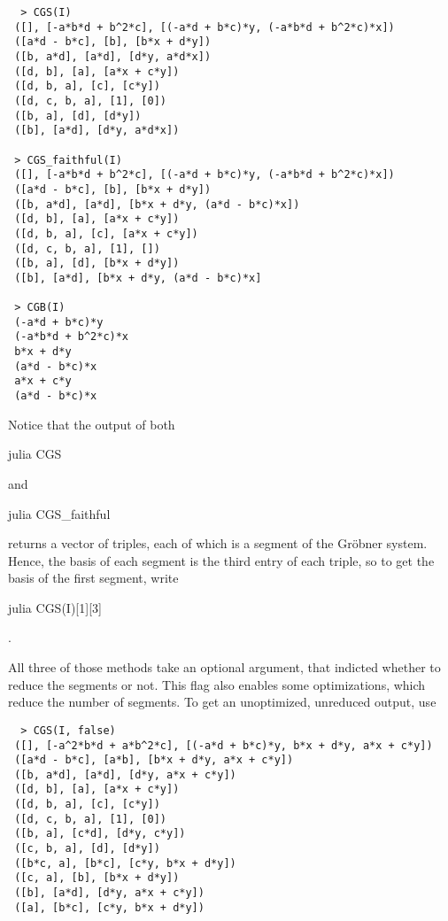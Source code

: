 \begin{verbatim}
  > CGS(I)
 ([], [-a*b*d + b^2*c], [(-a*d + b*c)*y, (-a*b*d + b^2*c)*x])
 ([a*d - b*c], [b], [b*x + d*y])
 ([b, a*d], [a*d], [d*y, a*d*x])
 ([d, b], [a], [a*x + c*y])
 ([d, b, a], [c], [c*y])
 ([d, c, b, a], [1], [0])
 ([b, a], [d], [d*y])
 ([b], [a*d], [d*y, a*d*x])

 > CGS_faithful(I)
 ([], [-a*b*d + b^2*c], [(-a*d + b*c)*y, (-a*b*d + b^2*c)*x])
 ([a*d - b*c], [b], [b*x + d*y])
 ([b, a*d], [a*d], [b*x + d*y, (a*d - b*c)*x])
 ([d, b], [a], [a*x + c*y])
 ([d, b, a], [c], [a*x + c*y])
 ([d, c, b, a], [1], [])
 ([b, a], [d], [b*x + d*y])
 ([b], [a*d], [b*x + d*y, (a*d - b*c)*x]

 > CGB(I)
 (-a*d + b*c)*y
 (-a*b*d + b^2*c)*x
 b*x + d*y
 (a*d - b*c)*x
 a*x + c*y
 (a*d - b*c)*x
\end{verbatim}
Notice that the output of both \begin{mintinline}{julia} CGS \end{mintinline} and \begin{mintinline}{julia} CGS_faithful \end{mintinline} returns a vector of triples, each of which is a segment of the Gröbner system. Hence, the basis of each segment is the third entry of each triple, so to get the basis of the first segment, write \begin{mintinline}{julia} CGS(I)[1][3] \end{mintinline}.

All three of those methods take an optional argument, that indicted whether to reduce the segments or not. This flag also enables some optimizations, which reduce the number of segments. To get an unoptimized, unreduced output, use
\begin{verbatim}
  > CGS(I, false)
 ([], [-a^2*b*d + a*b^2*c], [(-a*d + b*c)*y, b*x + d*y, a*x + c*y])
 ([a*d - b*c], [a*b], [b*x + d*y, a*x + c*y])
 ([b, a*d], [a*d], [d*y, a*x + c*y])
 ([d, b], [a], [a*x + c*y])
 ([d, b, a], [c], [c*y])
 ([d, c, b, a], [1], [0])
 ([b, a], [c*d], [d*y, c*y])
 ([c, b, a], [d], [d*y])
 ([b*c, a], [b*c], [c*y, b*x + d*y])
 ([c, a], [b], [b*x + d*y])
 ([b], [a*d], [d*y, a*x + c*y])
 ([a], [b*c], [c*y, b*x + d*y])
\end{verbatim}

